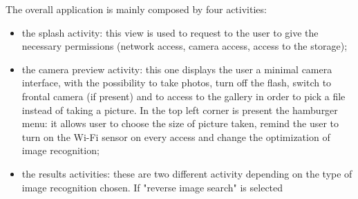 The overall application is mainly composed by four activities:
\begin{itemize}
	\item the splash activity: this view is used to request to the user to give 
		  the necessary permissions (network access, camera access, access to 
		  the storage);
	\item the camera preview activity: this one displays the user a minimal 
	      camera interface, with the possibility to take photos, turn off the 
	      flash, switch to frontal camera (if present) and to access to the 
	      gallery in order to pick a file instead of taking a picture. In the 
	      top left corner is present the hamburger menu: it allows user to 
	      choose the size of picture taken, remind the user to turn on the Wi-Fi 
	      sensor on every access and change the optimization of image recognition;
	\item the results activities: these are two different activity depending on 
	      the type of image recognition chosen. If "reverse image search" is selected 
\end{itemize}
